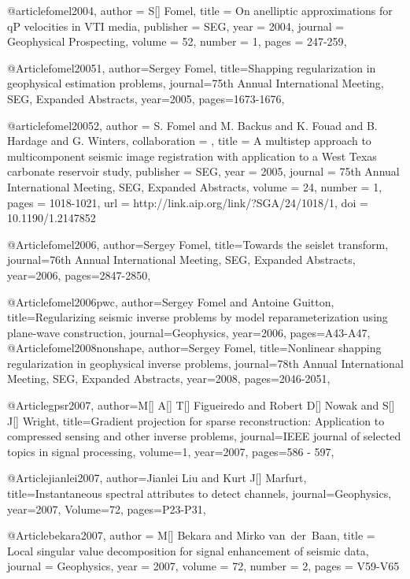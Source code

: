 @article{fomel2004,
  author =	 {S[] Fomel},
  title =	 {On anelliptic approximations for qP velocities in VTI media},
  publisher =	 {SEG},
  year =	 2004,
  journal =	 {Geophysical Prospecting},
  volume =	 52,
  number =	 1,
  pages =	 {247-259},
}

@Article{fomel20051,
  author={Sergey Fomel},
  title={Shapping regularization in geophysical estimation problems},
  journal={75th Annual International Meeting, SEG, Expanded Abstracts},
  year=2005,
  pages={1673-1676},
}

@article{fomel20052,
author = {S. Fomel and M. Backus and K. Fouad and B. Hardage and G. Winters},
collaboration = {},
title = {A multistep approach to multicomponent seismic image
                  registration with application to a {W}est {T}exas
                  carbonate reservoir study},
publisher = {SEG},
year = {2005},
journal = {75th Annual International Meeting, SEG, Expanded Abstracts},
volume = {24},
number = {1},
pages = {1018-1021},
url = {http://link.aip.org/link/?SGA/24/1018/1},
doi = {10.1190/1.2147852}
}

@Article{fomel2006,
  author={Sergey Fomel},
  title={Towards the seislet transform},
  journal={76th Annual International Meeting, SEG, Expanded Abstracts},
  year=2006,
  pages={2847-2850},
}

@Article{fomel2006pwc,
  author={Sergey Fomel and Antoine Guitton},
  title={Regularizing seismic inverse problems by model reparameterization using plane-wave construction},
  journal={Geophysics},
  year=2006,
  pages={A43-A47},
}
@Article{fomel2008nonshape,
  author={Sergey Fomel},
  title={Nonlinear shapping regularization in geophysical inverse problems},
  journal={78th Annual International Meeting, SEG, Expanded Abstracts},
  year=2008,
  pages={2046-2051},
}

@Article{gpsr2007,
author={M[] A[] T[] Figueiredo and Robert D[] Nowak and S[] J[] Wright},
title={Gradient projection for sparse reconstruction: Application to compressed sensing and other inverse problems},
journal={IEEE journal of selected topics in signal processing},
volume=1,
year=2007,
pages={586 - 597},
}

@Article{jianlei2007,
  author={Jianlei Liu and Kurt J[] Marfurt},
  title={Instantaneous spectral attributes to detect channels},
  journal={Geophysics},
  year=2007,
  Volume=72,
  pages={P23-P31},
}




@Article{bekara2007,
  author = 	 {M[] Bekara and Mirko van~der~Baan},
  title = 	 {Local singular value decomposition for signal enhancement of seismic data},
  journal = 	 {Geophysics},
  year = 	 2007,
  volume = 	 72,
  number = 	 2,
  pages = 	 {V59-V65}}

